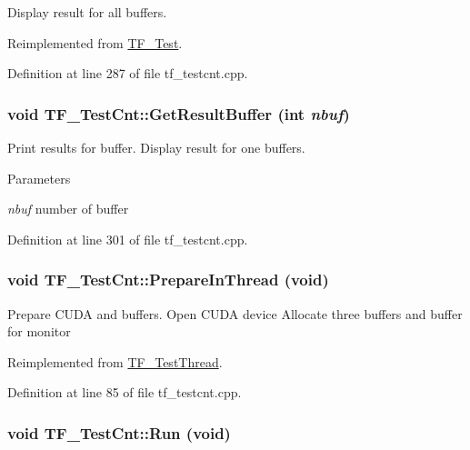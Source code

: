 Display result for all buffers. 

Reimplemented from \hyperlink{classTF__Test_a3e4bb4453e490c2a897ccc86b6e788bf}{TF\_\-Test}.

Definition at line 287 of file tf\_\-testcnt.cpp.\hypertarget{classTF__TestCnt_a865cbf57a7dcbf45e6ed2a29aac1526c}{
\subsubsection[{GetResultBuffer}]{\setlength{\rightskip}{0pt plus 5cm}void TF\_\-TestCnt::GetResultBuffer (int {\em nbuf})}}
\label{classTF__TestCnt_a865cbf57a7dcbf45e6ed2a29aac1526c}


Print results for buffer. Display result for one buffers.


\begin{DoxyParams}{Parameters}
\item[{\em nbuf}]number of buffer \end{DoxyParams}


Definition at line 301 of file tf\_\-testcnt.cpp.\hypertarget{classTF__TestCnt_a294a67b58d75600172433b8fae006a3e}{
\subsubsection[{PrepareInThread}]{\setlength{\rightskip}{0pt plus 5cm}void TF\_\-TestCnt::PrepareInThread (void)}}
\label{classTF__TestCnt_a294a67b58d75600172433b8fae006a3e}


Prepare CUDA and buffers. Open CUDA device Allocate three buffers and buffer for monitor 

Reimplemented from \hyperlink{classTF__TestThread_aebd5daf255a209019d018bc363021433}{TF\_\-TestThread}.

Definition at line 85 of file tf\_\-testcnt.cpp.\hypertarget{classTF__TestCnt_aa7b667d47ddc70942ff2ff73074c7696}{
\subsubsection[{Run}]{\setlength{\rightskip}{0pt plus 5cm}void TF\_\-TestCnt::Run (void)}}
\label{classTF__TestCnt_aa7b667d47ddc70942ff2ff73074c7696}


